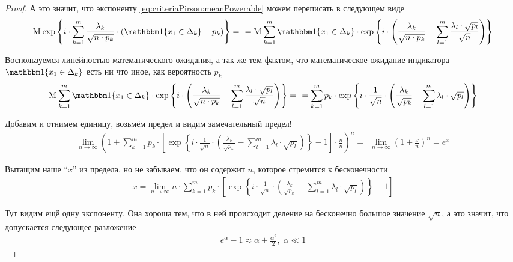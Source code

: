 \begin{proof}
  А это значит, что экспоненту \eqref{eq:criteriaPirson:meanPowerable} можем
  переписать в следующем виде
  \begin{align*}
      \mean{\exp{\left\{ i \cdot \sum_{k=1}^{m}\frac{\lambda_k}{
          \sqrt{n \cdot p_k}} \cdot \left(
          \Indicator{x_1 \in \Delta_k} - p_k \right) \right\}}} = \ \
      = \mean{\sum_{k=1}^{m} \Indicator{x_1 \in \Delta_k} \cdot
      \exp{\left\{ i \cdot \left( \frac{\lambda_k}{\sqrt{n \cdot p_k}}
          - \sum_{l=1}^{m} \frac{\lambda_l \cdot \sqrt{p_l}}{\sqrt{n}}
          \right) \right\}}}
  \end{align*}

  Воспользуемся линейностью математического ожидания, а так же тем фактом,
  что математическое ожидание индикатора $\Indicator{x_1 \in \Delta_k}$
  есть ни что иное, как вероятность $p_k$
  \begin{align*}
      \mean{\sum_{k=1}^{m} \Indicator{x_1 \in \Delta_k} \cdot
      \exp{\left\{ i \cdot \left( \frac{\lambda_k}{\sqrt{n \cdot p_k}}
          - \sum_{l=1}^{m} \frac{\lambda_l \cdot \sqrt{p_l}}{\sqrt{n}}
          \right) \right\}}} = \ \
      = \sum_{k=1}^{m} p_k \cdot \exp{\left\{ i \cdot \frac{1}{\sqrt{n}}
           \cdot \left(\frac{\lambda_k}{\sqrt{p_k}}
        - \sum_{l=1}^{m}\lambda_l \cdot \sqrt{p_l} \right) \right\}}
  \end{align*}

  Добавим и отнимем единицу, возьмём предел и видим замечательный предел!
  \begin{align*}
      \lim_{n \to \infty} \left( 1 + \sum_{k=1}^{m} p_k \cdot \left[
      \exp{\left\{ i \cdot \frac{1}{\sqrt{n}}
           \cdot \left(\frac{\lambda_k}{\sqrt{p_k}}
        - \sum_{l=1}^{m}\lambda_l \cdot \sqrt{p_l} \right) \right\}}
      - 1 \right] \cdot \frac{n}{n} \right)^n = \ \
      \lim_{n \to \infty} \left( 1 + \frac{x}{n} \right)^n = e^x
  \end{align*}

  Вытащим наше ``$x$'' из предела, но не забываем, что он содержит $n$,
  которое стремится к бесконечности
  \begin{align*}
      x = \lim_{n \to \infty} n \cdot \sum_{k=1}^{m} p_k \cdot \left[
      \exp{\left\{ i \cdot \frac{1}{\sqrt{n}}
           \cdot \left(\frac{\lambda_k}{\sqrt{p_k}}
        - \sum_{l=1}^{m}\lambda_l \cdot \sqrt{p_l} \right) \right\}}
      - 1 \right]
  \end{align*}

  Тут видим ещё одну экспоненту. Она хороша тем, что в ней происходит деление
  на бесконечно большое значение $\sqrt{n}$, а это значит, что допускается
  следующее разложение
  \begin{align*}
      e^{\alpha} - 1 \approx \alpha + \frac{\alpha^2}{2},\; \alpha \ll 1
  \end{align*}


\end{proof}
